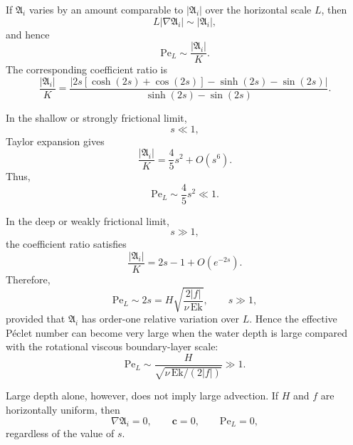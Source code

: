 \documentclass[10pt]{amsart}
\begin{document}
If \(\mathfrak A_i\) varies by an amount comparable to
\(\lvert\mathfrak A_i\rvert\) over the horizontal scale \(L\), then
\begin{equation}
L\lvert\nabla\mathfrak A_i\rvert
\sim
\lvert\mathfrak A_i\rvert,
\end{equation}
and hence
\begin{equation}
\mathrm{Pe}_L
\sim
\frac{\lvert\mathfrak A_i\rvert}{K}.
\end{equation}
The corresponding coefficient ratio is
\begin{equation}
\frac{\lvert\mathfrak A_i\rvert}{K}
=
\frac{
\left|
2s\left[\cosh(2s)+\cos(2s)\right]
-\sinh(2s)-\sin(2s)
\right|
}{
\sinh(2s)-\sin(2s)
}.
\end{equation}

In the shallow or strongly frictional limit,
\begin{equation}
s\ll1,
\end{equation}
Taylor expansion gives
\begin{equation}
\frac{\lvert\mathfrak A_i\rvert}{K}
=
\frac{4}{5}s^2+O(s^6).
\end{equation}
Thus,
\begin{equation}
\mathrm{Pe}_L
\sim
\frac{4}{5}s^2
\ll1.
\end{equation}

In the deep or weakly frictional limit,
\begin{equation}
s\gg1,
\end{equation}
the coefficient ratio satisfies
\begin{equation}
\frac{\lvert\mathfrak A_i\rvert}{K}
=
2s-1+O\left(e^{-2s}\right).
\end{equation}
Therefore,
\begin{equation}
\mathrm{Pe}_L
\sim
2s
=
H\sqrt{\frac{2|f|}{\nu\,\mathrm{Ek}}},
\qquad s\gg1,
\end{equation}
provided that \(\mathfrak A_i\) has order-one relative variation over \(L\).
Hence the effective P\'eclet number can become very large when the water
depth is large compared with the rotational viscous boundary-layer scale:
\begin{equation}
\boxed{
\mathrm{Pe}_L
\sim
\frac{H}{\sqrt{\nu\,\mathrm{Ek}/(2|f|)}}
\gg1
}.
\end{equation}

Large depth alone, however, does not imply large advection. If \(H\) and \(f\)
are horizontally uniform, then
\begin{equation}
\nabla\mathfrak A_i=0,
\qquad
\boldsymbol{c}=0,
\qquad
\mathrm{Pe}_L=0,
\end{equation}
regardless of the value of \(s\).
\end{document}
